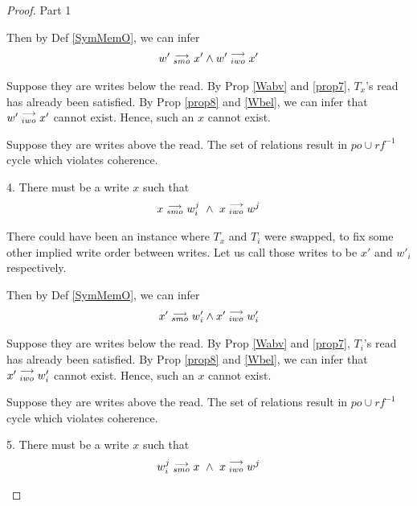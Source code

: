 \begin{proof}{Part 1}
\begin{itemize}
                        Then by Def \ref{SymMemO}, we can infer 
                        \begin{align*}
                            w'\stackrel{\longrightarrow}{_{smo}}x' \wedge w'\stackrel{\longrightarrow}{_{iwo}}x'
                        \end{align*}

                        Suppose they are writes below the read. 
                        By Prop \ref{Wabv} and \ref{prop7}, $T_x$'s read has already been satisfied. By Prop \ref{prop8} and \ref{Wbel}, we can infer that $w'\stackrel{\longrightarrow}{_{iwo}}x'$ cannot exist. Hence, such an $x$ cannot exist. 
                        
                        Suppose they are writes above the read.
                        The set of relations result in $po \cup rf^{-1}$ cycle which violates coherence.  

                        4. There must be a write $x$ such that 
                        \begin{align*}
                            \reln{x}{smo}{w_i^j} \ \wedge \ \reln{x}{iwo}{w^j}
                        \end{align*}

                        There could have been an instance where $T_x$ and $T_i$ were swapped, to fix some other implied write order between writes. 
                        Let us call those writes to be $x'$ and $w'_i$ respectively.
                        
                        Then by Def \ref{SymMemO}, we can infer 
                        \begin{align*}
                            x'\stackrel{\longrightarrow}{_{smo}}w'_i \wedge x'\stackrel{\longrightarrow}{_{iwo}}w'_i
                        \end{align*}

                        Suppose they are writes below the read. 
                        By Prop \ref{Wabv} and \ref{prop7}, $T_i$'s read has already been satisfied. By Prop \ref{prop8} and \ref{Wbel}, we can infer that $x'\stackrel{\longrightarrow}{_{iwo}}w'_i$ cannot exist. Hence, such an $x$ cannot exist.
                        
                        Suppose they are writes above the read.
                        The set of relations result in $po \cup rf^{-1}$ cycle which violates coherence.  

                        5. There must be a write $x$ such that 
                        \begin{align*}
                            \reln{w_i^j}{smo}{x} \ \wedge \ \reln{x}{iwo}{w^j}
                        \end{align*}
                        

\end{itemize}
\end{proof}
